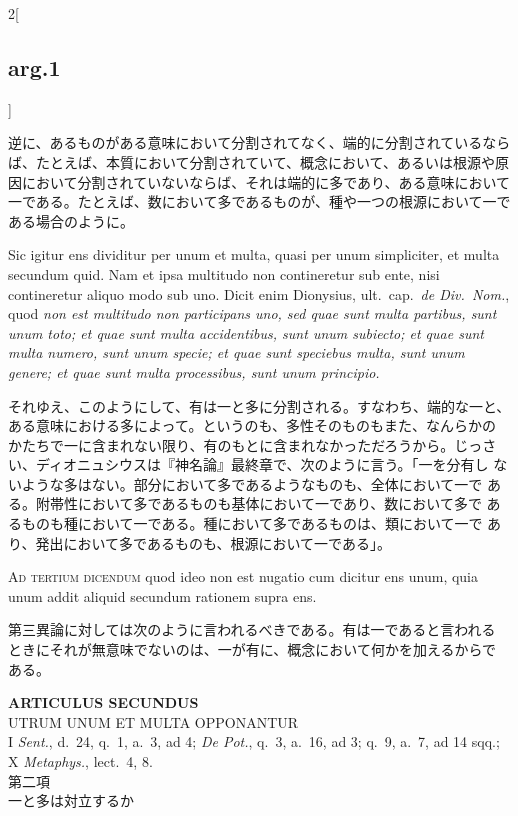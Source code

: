 \documentclass[paper=a4paper,fontsize=10pt,jafontsize=9pt,titlepage]{jlreq}
\begin{document}
\begin{paracol}{2}[\subsection{arg.1}]
\switchcolumn

逆に、あるものがある意味において分割されてなく、端的に分割されているなら
ば、たとえば、本質において分割されていて、概念において、あるいは根源や原
因において分割されていないならば、それは端的に多であり、ある意味において
一である。たとえば、数において多であるものが、種や一つの根源において一で
ある場合のように。

\switchcolumn*

Sic igitur ens dividitur per unum et multa, quasi per unum simpliciter,
et multa secundum quid. Nam et ipsa multitudo non contineretur sub ente,
nisi contineretur aliquo modo sub uno. Dicit enim Dionysius,
ult.~cap.~{\itshape de Div.~Nom.}, quod {\itshape non est multitudo non
participans uno, sed quae sunt multa partibus, sunt unum toto; et quae
sunt multa accidentibus, sunt unum subiecto; et quae sunt multa numero,
sunt unum specie; et quae sunt speciebus multa, sunt unum genere; et
quae sunt multa processibus, sunt unum principio.}

\switchcolumn

それゆえ、このようにして、有は一と多に分割される。すなわち、端的な一と、
ある意味における多によって。というのも、多性そのものもまた、なんらかの
かたちで一に含まれない限り、有のもとに含まれなかっただろうから。じっさ
い、ディオニュシウスは『神名論』最終章で、次のように言う。「一を分有し
ないような多はない。部分において多であるようなものも、全体において一で
ある。附帯性において多であるものも基体において一であり、数において多で
あるものも種において一である。種において多であるものは、類において一で
あり、発出において多であるものも、根源において一である」。

\switchcolumn*[\subsection{ad.3}]

{\scshape Ad tertium dicendum} quod ideo non est nugatio cum dicitur ens
unum, quia unum addit aliquid secundum rationem supra ens.

\switchcolumn

第三異論に対しては次のように言われるべきである。有は一であると言われる
ときにそれが無意味でないのは、一が有に、概念において何かを加えるからで
ある。

\end{paracol}


\newpage
{}

\begin{center}
 {\Large {\bfseries ARTICULUS SECUNDUS}}\\
 {\large UTRUM UNUM ET MULTA OPPONANTUR}\\
 {\footnotesize I {\itshape Sent.}, d.~24, q.~1, a.~3, ad 4; {\itshape
 De Pot.}, q.~3, a.~16, ad 3; q.~9, a.~7, ad 14 sqq.; X {\itshape
 Metaphys.}, lect.~4, 8.}\\
 {\Large 第二項\\一と多は対立するか}
\end{center}
\end{document}
